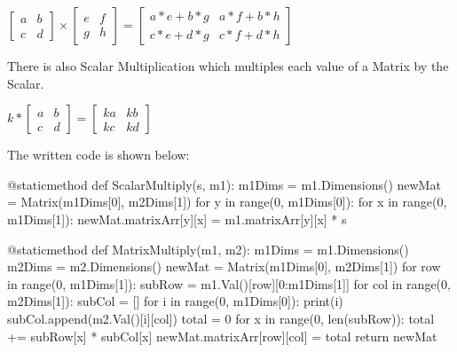 \begin{flushleft}
\begin{enumerate}
                        \vspace{0.25cm}
                        \begin{center}
                            $\begin{bmatrix}
                                a & b\\
                                c & d
                            \end{bmatrix} \times
                            \begin{bmatrix}
                                e & f\\
                                g & h
                            \end{bmatrix} =
                            \begin{bmatrix}
                                a*e + b*g & a*f + b*h\\
                                c*e + d*g & c*f + d*h
                            \end{bmatrix}$
                        \end{center}
                        There is also Scalar Multiplication which multiples each value of a Matrix by the Scalar.
                        \begin{center}
                            $k *
                            \begin{bmatrix}
                                a & b\\
                                c & d
                            \end{bmatrix} =
                            \begin{bmatrix}
                                ka & kb\\
                                kc & kd
                            \end{bmatrix}$
                        \end{center}
                        \vspace{0.25cm}

                        The written code is shown below:
                        \begin{pythoncode}
@staticmethod                        
def ScalarMultiply(s, m1):
    m1Dims = m1.Dimensions()
    newMat = Matrix(m1Dims[0], m2Dims[1])
    for y in range(0, m1Dims[0]):
        for x in range(0, m1Dims[1]):
            newMat.matrixArr[y][x] = m1.matrixArr[y][x] * s

@staticmethod
def MatrixMultiply(m1, m2):
    m1Dims = m1.Dimensions()
    m2Dims = m2.Dimensions()
    newMat = Matrix(m1Dims[0], m2Dims[1])
    for row in range(0, m1Dims[1]):
        subRow = m1.Val()[row][0:m1Dims[1]]
        for col in range(0, m2Dims[1]):
            subCol = []
            for i in range(0, m1Dims[0]):
                print(i)
                subCol.append(m2.Val()[i][col])
            total = 0
            for x in range(0, len(subRow)):
                total += subRow[x] * subCol[x]
            newMat.matrixArr[row][col] = total
    return newMat
                        \end{pythoncode}


\end{enumerate}
\end{flushleft}
